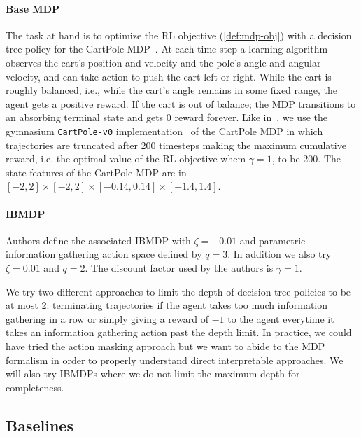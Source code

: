 \paragraph{Base MDP} The task at hand is to optimize the RL objective (\ref{def:mdp-obj}) with a decision tree policy for the CartPole MDP~\cite{cartpole}.
At each time step a learning algorithm observes the cart's position and velocity and the pole's angle and angular velocity, and can take action to push the cart left or right.
While the cart is roughly balanced, i.e., while the cart's angle remains in some fixed range, the agent gets a positive reward.
If the cart is out of balance; the MDP transitions to an absorbing terminal state and gets 0 reward forever.
Like in~\cite{topin2021iterative}, we use the gymnasium \texttt{CartPole-v0} implementation~\cite{gymnasium} of the CartPole MDP in which trajectories are truncated after 200 timesteps making the maximum cumulative reward, i.e. the optimal value of the RL objective whem $\gamma=1$, to be 200.
The state features of the CartPole MDP are in $[-2, 2] \times [-2, 2] \times [-0.14, 0.14] \times [-1.4, 1.4]$.

\paragraph{IBMDP} Authors define the associated IBMDP with $\zeta=-0.01$ and parametric information gathering action space defined by $q=3$.
In addition we also try $\zeta=0.01$ and $q=2$.
The discount factor used by the authors is $\gamma=1$.

We try two different approaches to limit the depth of decision tree policies to be at most 2: terminating trajectories if the agent takes too much information gathering in a row or simply giving a reward of $-1$ to the agent everytime it takes an information gathering action past the depth limit.
In practice, we could have tried the action masking approach but we want to abide to the MDP formalism in order to properly understand direct interpretable approaches.
We will also try IBMDPs where we do not limit the maximum depth for completeness.

\subsection{Baselines}
